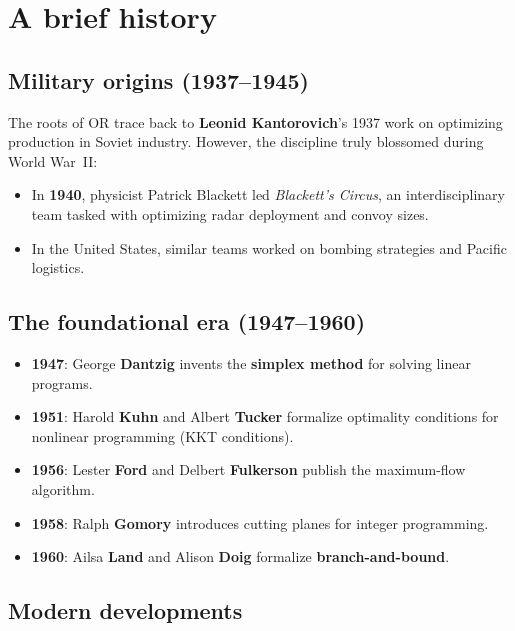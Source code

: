 \section{A brief history}

\subsection{Military origins (1937--1945)}

The roots of OR trace back to \textbf{Leonid Kantorovich}'s 1937 work on
optimizing production in Soviet industry.  However, the discipline truly
blossomed during World War~II:

\begin{itemize}
  \item In \textbf{1940}, physicist Patrick Blackett led
        \textit{Blackett's Circus}, an interdisciplinary team tasked with
        optimizing radar deployment and convoy sizes.
  \item In the United States, similar teams worked on bombing strategies
        and Pacific logistics.
\end{itemize}

\subsection{The foundational era (1947--1960)}

\begin{itemize}
  \item \textbf{1947}: George \textbf{Dantzig} invents the \textbf{simplex
        method} for solving linear programs.
  \item \textbf{1951}: Harold \textbf{Kuhn} and Albert \textbf{Tucker}
        formalize optimality conditions for nonlinear programming (KKT
        conditions).
  \item \textbf{1956}: Lester \textbf{Ford} and Delbert \textbf{Fulkerson}
        publish the maximum-flow algorithm.
  \item \textbf{1958}: Ralph \textbf{Gomory} introduces cutting planes for
        integer programming.
  \item \textbf{1960}: Ailsa \textbf{Land} and Alison \textbf{Doig}
        formalize \textbf{branch-and-bound}.
\end{itemize}

\subsection{Modern developments}

